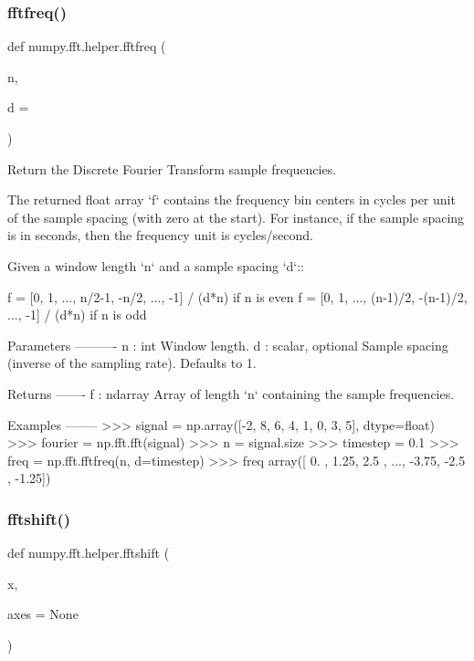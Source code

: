 \subsubsection{\texorpdfstring{fftfreq()}{fftfreq()}}
{\footnotesize\ttfamily def numpy.\+fft.\+helper.\+fftfreq (\begin{DoxyParamCaption}\item[{}]{n,  }\item[{}]{d = {} }\end{DoxyParamCaption})}

\begin{DoxyVerb}Return the Discrete Fourier Transform sample frequencies.

The returned float array `f` contains the frequency bin centers in cycles
per unit of the sample spacing (with zero at the start).  For instance, if
the sample spacing is in seconds, then the frequency unit is cycles/second.

Given a window length `n` and a sample spacing `d`::

  f = [0, 1, ...,   n/2-1,     -n/2, ..., -1] / (d*n)   if n is even
  f = [0, 1, ..., (n-1)/2, -(n-1)/2, ..., -1] / (d*n)   if n is odd

Parameters
----------
n : int
    Window length.
d : scalar, optional
    Sample spacing (inverse of the sampling rate). Defaults to 1.

Returns
-------
f : ndarray
    Array of length `n` containing the sample frequencies.

Examples
--------
>>> signal = np.array([-2, 8, 6, 4, 1, 0, 3, 5], dtype=float)
>>> fourier = np.fft.fft(signal)
>>> n = signal.size
>>> timestep = 0.1
>>> freq = np.fft.fftfreq(n, d=timestep)
>>> freq
array([ 0.  ,  1.25,  2.5 , ..., -3.75, -2.5 , -1.25])\end{DoxyVerb}
 \mbox{\label{namespacenumpy_1_1fft_1_1helper_a22c90de47c6858514c37c73bd828454c}} 
\subsubsection{\texorpdfstring{fftshift()}{fftshift()}}
{\footnotesize\ttfamily def numpy.\+fft.\+helper.\+fftshift (\begin{DoxyParamCaption}\item[{}]{x,  }\item[{}]{axes = {\ttfamily None} }\end{DoxyParamCaption})}

